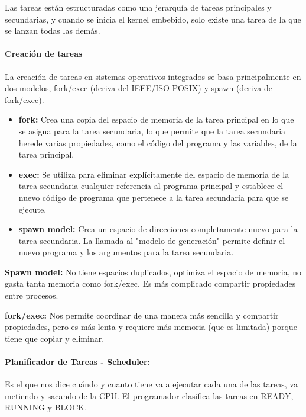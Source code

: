 \documentclass[12pt, twoside, openright]{report} %
\begin{document}
\begin{description}
	      Las tareas están estructuradas como una jerarquía de tareas principales y secundarias, y cuando se inicia el kernel embebido, solo existe una tarea de la que se lanzan todas las demás.


	      \paragraph{Creación de tareas}
	      La creación de tareas en sistemas operativos integrados se basa principalmente en dos modelos, fork/exec (deriva del IEEE/ISO POSIX) y spawn (deriva de fork/exec).

	      \begin{itemize}
		      \item \textbf{fork:} Crea una copia del espacio de memoria de la tarea principal en lo que se asigna para la tarea secundaria, lo que permite que la tarea secundaria herede varias propiedades, como el código del programa y las variables, de la tarea principal.
		      \item \textbf{exec:} Se utiliza para eliminar explícitamente del espacio de memoria de la tarea secundaria cualquier referencia al programa principal y establece el nuevo código de programa que pertenece a la tarea secundaria para que se ejecute.
		      \item \textbf{spawn model:} Crea un espacio de direcciones completamente nuevo para la tarea secundaria. La llamada al "modelo de generación" permite definir el nuevo programa y los argumentos para la tarea secundaria.
	      \end{itemize}

	      \textbf{Spawn model:} No tiene espacios duplicados, optimiza el espacio de memoria, no gasta tanta memoria como fork/exec. Es más complicado compartir propiedades entre procesos.

	      \textbf{fork/exec:} Nos permite coordinar de una manera más sencilla y compartir propiedades, pero es más lenta y requiere más memoria (que es limitada) porque tiene que copiar y eliminar.

	      \paragraph{Planificador de Tareas - Scheduler:} Es el que nos dice cuándo y cuanto tiene va a ejecutar cada una de las tareas, va metiendo y sacando de la CPU. El programador clasifica las tareas en READY, RUNNING y BLOCK.


\end{description}
\end{document}
